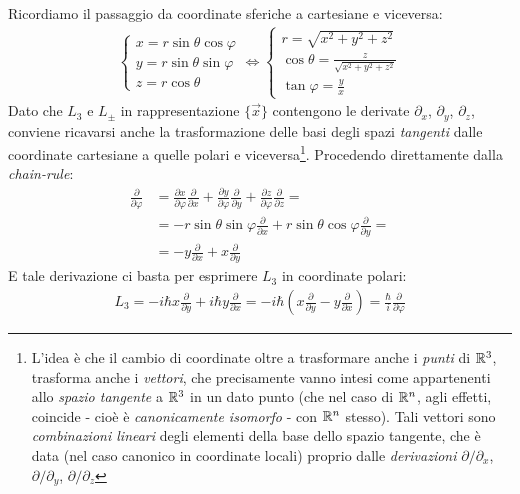 \documentclass[../../FisicaTeorica.tex]{subfiles}
\begin{document}
Ricordiamo il passaggio da coordinate sferiche a cartesiane e viceversa:
\begin{align*}
\begin{cases}
x = r\sin\theta \cos \varphi\\
y = r\sin\theta \sin\varphi\\
z = r\cos\theta
\end{cases} \Leftrightarrow 
\begin{cases}
r = \sqrt{x^2 + y^2 +z^2}\\
\cos\theta = \displaystyle\frac{z}{\sqrt{x^2 + y^2 + z^2}}\\
\tan\varphi = \displaystyle \frac{y}{x}
\end{cases}
\end{align*}
Dato che $L_3$ e $L_\pm$ in rappresentazione $\{\vec{x}\}$ contengono le derivate $\partial_x$, $\partial_y$, $\partial_z$, conviene ricavarsi anche la trasformazione delle basi degli spazi \textit{tangenti} dalle coordinate cartesiane a quelle polari e viceversa\footnote{L'idea è che il cambio di coordinate oltre a trasformare anche i \textit{punti} di $\mathbb{R}^3$, trasforma anche i \textit{vettori}, che precisamente vanno intesi come appartenenti allo \textit{spazio tangente} a $\mathbb{R}^3$ in un dato punto (che nel caso di $\mathbb{R}^n$, agli effetti, coincide - cioè è \textit{canonicamente isomorfo} - con $\mathbb{R}^n$ stesso). Tali vettori sono \textit{combinazioni lineari} degli elementi della base dello spazio tangente, che è data (nel caso canonico in coordinate locali) proprio dalle \textit{derivazioni} $\partial/\partial_x$, $\partial/\partial_y$, $\partial/\partial_z$}. Procedendo direttamente dalla \textit{chain-rule}:
\begin{align}
\label{eqn:partial-phi}
\frac{\partial}{\partial \varphi} &=\frac{\partial x}{\partial \varphi}\frac{\partial}{\partial x} + \frac{\partial y}{\partial \varphi}\frac{\partial}{\partial y} + \frac{\partial z}{\partial \varphi}\frac{\partial}{\partial z} =\\ \nonumber
&= -r\sin\theta\sin\varphi\frac{\partial}{\partial x} + r\sin\theta \cos\varphi \frac{\partial}{\partial y} =\\ \nonumber
&= -y\frac{\partial}{\partial x} + x\frac{\partial}{\partial y}
\end{align}
E tale derivazione ci basta per esprimere $L_3$ in coordinate polari:
\begin{align*}
L_3 = -i\hbar x \frac{\partial}{\partial y}+ i\hbar y \frac{\partial}{\partial x} = -i\hbar \left(
x\frac{\partial}{\partial y} -y\frac{\partial}{\partial x}
\right) = \frac{\hbar}{i}\frac{\partial}{\partial \varphi}
\end{align*}
\end{document}

